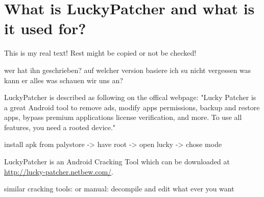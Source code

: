 \section{What is LuckyPatcher and what is it used for?} \label{section:luckypatcher-explain}
This is my real text! Rest might be copied or not be checked!


wer hat ihn geschrieben?\newline
auf welcher version basiere ich\newline
su nicht vergessen\newline
was kann er alles\newline
was schauen wir uns an?\newline

LuckyPatcher is described as following on the offical webpage: "Lucky Patcher is a great Android tool to remove ads, modify apps permissions, backup and restore apps, bypass premium applications license verification, and more. To use all features, you need a rooted device." \cite{luckyPatcherOfficial}

install apk from palystore -> have root -> open lucky -> chose mode

LuckyPatcher is an Android Cracking Tool which can be downloaded at \url{http://lucky-patcher.netbew.com/}.

similar cracking tools:\newline
or manual: decompile and edit what ever you want \newline
